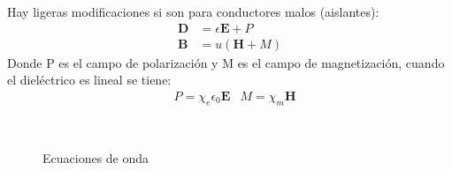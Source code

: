 \documentclass[12pt,fleqn,a4paper,]{LegrandOrangeBook}
\begin{document}
Hay ligeras modificaciones si son para conductores malos (aislantes):
\begin{subequations}
\begin{align}
\textbf{D}&= \epsilon \textbf{E} + P\\
\textbf{B}&=u(\textbf{H} + M)
\end{align}
\end{subequations}
Donde P es el campo de polarización y M es el campo de magnetización, cuando el dieléctrico es lineal se tiene:
\begin{align*}
&P=\chi_e\epsilon_0\textbf{E} &M=\chi_m\textbf{H}
\end{align*}
\begin{figure}[H]
\centering
{}\\
\caption{Ecuaciones de onda}
\end{figure}



\end{document}
